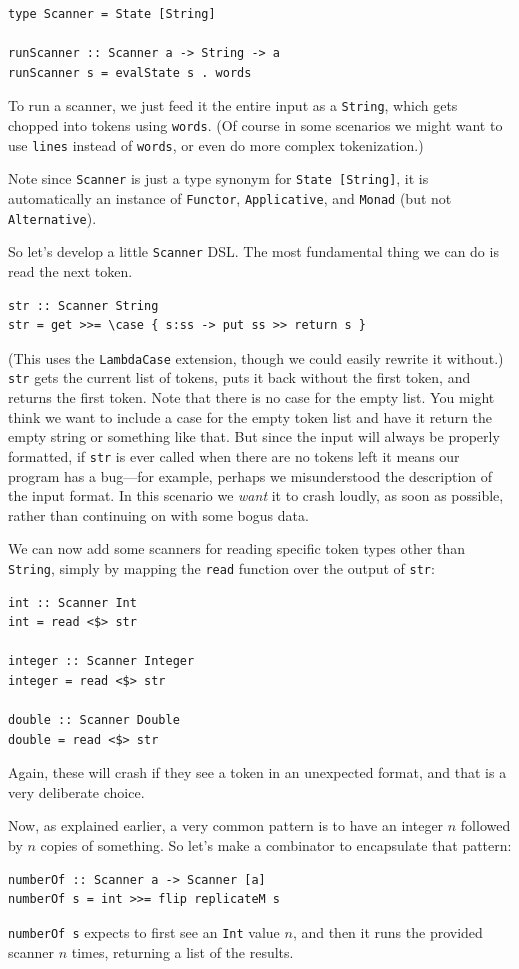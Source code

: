 \documentclass{book}
\newcommand{\h}[1]{\texttt{#1}}
\begin{document}
\begin{verbatim}
type Scanner = State [String]

runScanner :: Scanner a -> String -> a
runScanner s = evalState s . words
\end{verbatim}

To run a scanner, we just feed it the entire input as a \h{String},
which gets chopped into tokens using \h{words}.  (Of course in some
scenarios we might want to use \h{lines} instead of \h{words}, or even do
more complex tokenization.)

Note since \h{Scanner} is just a type synonym for \h{State [String]}, it
is automatically an instance of \h{Functor}, \h{Applicative}, and
\h{Monad} (but not \h{Alternative}).

So let's develop a little \h{Scanner} DSL.  The most fundamental thing
we can do is read the next token.
\begin{verbatim}
str :: Scanner String
str = get >>= \case { s:ss -> put ss >> return s }
\end{verbatim}
(This uses the \h{LambdaCase} extension, though we
could easily rewrite it without.)  \h{str} gets the current list of
tokens, puts it back without the first token, and returns the first
token.  Note that there is no case for the empty list.  You might
think we want to include a case for the empty token list and have it
return the empty string or something like that.  But since the input
will always be properly formatted, if \h{str} is ever called when
there are no tokens left it means our program has a bug---for example,
perhaps we misunderstood the description of the input format.  In this
scenario we \emph{want} it to crash loudly, as soon as possible,
rather than continuing on with some bogus data.

We can now add some scanners for reading specific token types other
than \h{String}, simply by mapping the \h{read} function over the output
of \h{str}:
\begin{verbatim}
int :: Scanner Int
int = read <$> str

integer :: Scanner Integer
integer = read <$> str

double :: Scanner Double
double = read <$> str
\end{verbatim}
Again, these will crash if they see a token in an unexpected format,
and that is a very deliberate choice.

Now, as explained earlier, a very common pattern is to have an
integer $n$ followed by $n$ copies of something.  So let's make a
combinator to encapsulate that pattern:
\begin{verbatim}
numberOf :: Scanner a -> Scanner [a]
numberOf s = int >>= flip replicateM s
\end{verbatim}
\h{numberOf s} expects to first see an \h{Int} value $n$, and then it runs
the provided scanner $n$ times, returning a list of the results.
\end{document}
